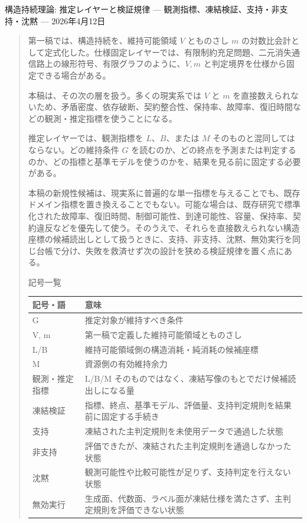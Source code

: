 \documentclass[12pt,a4paper]{article}
\begin{document}
\PaperTitleBlock
  {構造持続理論: 推定レイヤーと検証規律}
  {— 観測指標、凍結検証、支持・非支持・沈黙 —}
  {2026年4月12日}

\begin{abstract}
第一稿では、構造持続を、維持可能領域 \(V\) とものさし \(m\) の対数比会計として定式化した。仕様固定レイヤーでは、有限制約充足問題、二元消失通信路上の線形符号、有限グラフのように、\(V,m\) と判定境界を仕様から固定できる場合がある。

本稿は、その次の層を扱う。多くの現実系では \(V\) と \(m\) を直接数えられないため、矛盾密度、依存破断、契約整合性、保持率、故障率、復旧時間などの観測・推定指標を使うことになる。

推定レイヤーでは、観測指標を \(L\)、\(B\)、または \(M\) そのものと混同してはならない。どの維持条件 \(G\) を読むのか、どの終点を予測または判定するのか、どの指標と基準モデルを使うのかを、結果を見る前に固定する必要がある。

本稿の新規性候補は、現実系に普遍的な単一指標を与えることでも、既存ドメイン指標を置き換えることでもない。可能な場合は、既存研究で標準化された故障率、復旧時間、制御可能性、到達可能性、容量、保持率、契約違反などを優先して使う。そのうえで、それらを直接数えられない構造座標の候補読出しとして扱うときに、支持、非支持、沈黙、無効実行を同じ台帳で分け、失敗を救済せず次の設計を狭める検証規律を置く点にある。

記号一覧

{\def\LTcaptype{table} %
\begin{longtable}[]{@{}
  >{\raggedright\arraybackslash}p{}
  >{\raggedright\arraybackslash}p{}@{}}
\toprule\noalign{}
\begin{minipage}[b]{\linewidth}\raggedright
記号・語
\end{minipage} & \begin{minipage}[b]{\linewidth}\raggedright
意味
\end{minipage} \\
\midrule\noalign{}
\endhead
\bottomrule\noalign{}
\endlastfoot
G & 推定対象が維持すべき条件 \\
V, m & 第一稿で定義した維持可能領域とものさし \\
L/B & 維持可能領域側の構造消耗・純消耗の候補座標 \\
M & 資源側の有効維持余力 \\
観測・推定指標 & L/B/M そのものではなく、凍結写像のもとでだけ候補読出しになる量 \\
凍結検証 & 指標、終点、基準モデル、評価量、支持判定規則を結果前に固定する手続き \\
支持 & 凍結された主判定規則を未使用データで通過した状態 \\
非支持 & 評価できたが、凍結された主判定規則を通過しなかった状態 \\
沈黙 & 観測可能性や比較可能性が足りず、支持判定を行えない状態 \\
無効実行 & 生成面、代数面、ラベル面が凍結仕様を満たさず、主判定規則を評価できない状態 \\
\end{longtable}
}
\end{abstract}
\end{document}
